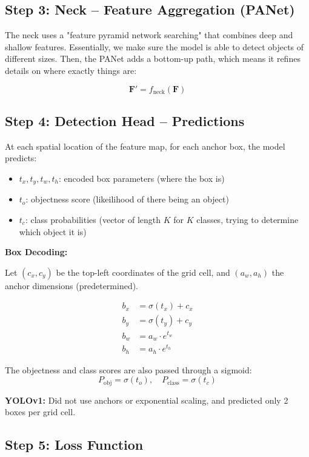 \documentclass[11pt]{article}
\begin{document}
\subsection{Step 3: Neck – Feature Aggregation (PANet)}

The neck uses a "feature pyramid network searching" that combines deep and shallow features. Essentially, we make sure the model is able to detect objects of different sizes. Then, the PANet adds a bottom-up path, which means it refines details on where exactly things are:

\[
\mathbf{F}' = f_{\text{neck}}(\mathbf{F})
\] \cite{liu2018panet}

\subsection{Step 4: Detection Head – Predictions}

At each spatial location of the feature map, for each anchor box, the model predicts:

\begin{itemize}[leftmargin=2em]
    \item $t_x, t_y, t_w, t_h$: encoded box parameters (where the box is)
    \item $t_o$: objectness score (likeilihood of there being an object)
    \item $t_c$: class probabilities (vector of length $K$ for $K$ classes, trying to determine which object it is)
\end{itemize} 

\textbf{Box Decoding:}

Let $(c_x, c_y)$ be the top-left coordinates of the grid cell, and $(a_w, a_h)$ the anchor dimensions (predetermined).

\[
\begin{aligned}
b_x &= \sigma(t_x) + c_x \\
b_y &= \sigma(t_y) + c_y \\
b_w &= a_w \cdot e^{t_w} \\
b_h &= a_h \cdot e^{t_h}
\end{aligned}
\]

The objectness and class scores are also passed through a sigmoid:
\[
P_{\text{obj}} = \sigma(t_o), \quad P_{\text{class}} = \sigma(t_c)
\] \cite{redmon2018yolov3}

\textbf{YOLOv1:} Did not use anchors or exponential scaling, and predicted only 2 boxes per grid cell. \cite{redmon2016you}

\subsection{Step 5: Loss Function}
\end{document}
